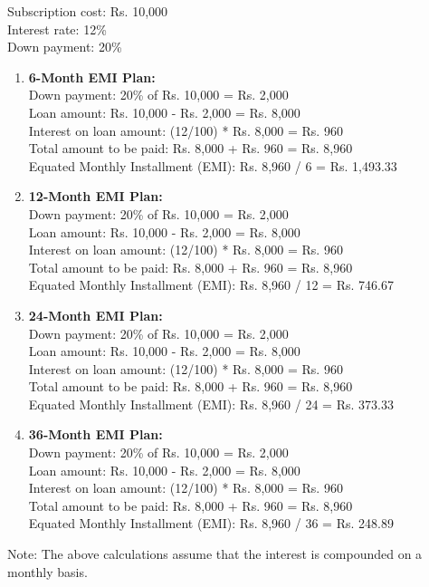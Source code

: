 Subscription cost: Rs. 10,000\\
Interest rate: 12\% \\
Down payment: 20\%
\begin{enumerate}
\item \textbf{6-Month EMI Plan:}\\
   Down payment: 20\% of Rs. 10,000 = Rs. 2,000 \\
   Loan amount: Rs. 10,000 - Rs. 2,000 = Rs. 8,000 \\
   Interest on loan amount: (12/100) * Rs. 8,000 = Rs. 960 \\
   Total amount to be paid: Rs. 8,000 + Rs. 960 = Rs. 8,960 \\
   Equated Monthly Installment (EMI): Rs. 8,960 / 6 = Rs. 1,493.33

\item \textbf{12-Month EMI Plan:}\\
   Down payment: 20\% of Rs. 10,000 = Rs. 2,000 \\
   Loan amount: Rs. 10,000 - Rs. 2,000 = Rs. 8,000 \\
   Interest on loan amount: (12/100) * Rs. 8,000 = Rs. 960 \\
   Total amount to be paid: Rs. 8,000 + Rs. 960 = Rs. 8,960 \\
   Equated Monthly Installment (EMI): Rs. 8,960 / 12 = Rs. 746.67

    \item \textbf{24-Month EMI Plan:}\\
   Down payment: 20\% of Rs. 10,000 = Rs. 2,000 \\
   Loan amount: Rs. 10,000 - Rs. 2,000 = Rs. 8,000 \\
   Interest on loan amount: (12/100) * Rs. 8,000 = Rs. 960 \\
   Total amount to be paid: Rs. 8,000 + Rs. 960 = Rs. 8,960 \\
   Equated Monthly Installment (EMI): Rs. 8,960 / 24 = Rs. 373.33

    \item \textbf{36-Month EMI Plan:}\\
   Down payment: 20\% of Rs. 10,000 = Rs. 2,000 \\
   Loan amount: Rs. 10,000 - Rs. 2,000 = Rs. 8,000 \\
   Interest on loan amount: (12/100) * Rs. 8,000 = Rs. 960 \\
   Total amount to be paid: Rs. 8,000 + Rs. 960 = Rs. 8,960 \\
   Equated Monthly Installment (EMI): Rs. 8,960 / 36 = Rs. 248.89
\end{enumerate}
Note: The above calculations assume that the interest is compounded on a monthly basis.